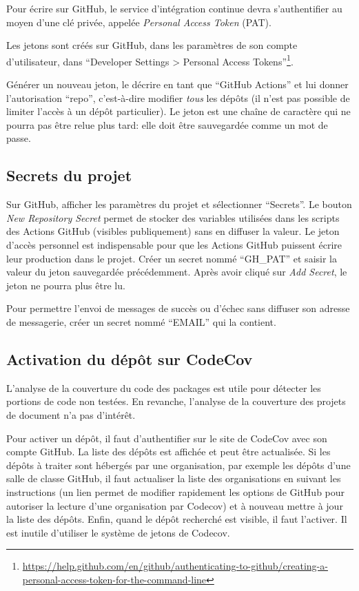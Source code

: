 \documentclass[
  12pt,
  french,
  a4paper,
  extrafontsizes,onecolumn,openright
  ]{memoir}
\begin{document}
Pour écrire sur GitHub, le service d'intégration continue devra s'authentifier au moyen d'une clé privée, appelée \emph{Personal Access Token} (PAT).

Les jetons sont créés sur GitHub, dans les paramètres de son compte d'utilisateur, dans \enquote{Developer Settings \textgreater{} Personal Access Tokens}\footnote{\url{https://help.github.com/en/github/authenticating-to-github/creating-a-personal-access-token-for-the-command-line}}.

Générer un nouveau jeton, le décrire en tant que \enquote{GitHub Actions} et lui donner l'autorisation \enquote{repo}, c'est-à-dire modifier \emph{tous} les dépôts (il n'est pas possible de limiter l'accès à un dépôt particulier).
Le jeton est une chaîne de caractère qui ne pourra pas être relue plus tard: elle doit être sauvegardée comme un mot de passe.

\hypertarget{sec:secrets-ci}{%
\subsection{Secrets du projet}\label{sec:secrets-ci}}

Sur GitHub, afficher les paramètres du projet et sélectionner \enquote{Secrets}.
Le bouton \emph{New Repository Secret} permet de stocker des variables utilisées dans les scripts des Actions GitHub (visibles publiquement) sans en diffuser la valeur.
Le jeton d'accès personnel est indispensable pour que les Actions GitHub puissent écrire leur production dans le projet.
Créer un secret nommé \enquote{GH\_PAT} et saisir la valeur du jeton sauvegardée précédemment.
Après avoir cliqué sur \emph{Add Secret}, le jeton ne pourra plus être lu.

Pour permettre l'envoi de messages de succès ou d'échec sans diffuser son adresse de messagerie, créer un secret nommé \enquote{EMAIL} qui la contient.

\hypertarget{activation-du-duxe9puxf4t-sur-codecov}{%
\subsection{Activation du dépôt sur CodeCov}\label{activation-du-duxe9puxf4t-sur-codecov}}

L'analyse de la couverture du code des packages est utile pour détecter les portions de code non testées.
En revanche, l'analyse de la couverture des projets de document n'a pas d'intérêt.

Pour activer un dépôt, il faut d'authentifier sur le site de CodeCov avec son compte GitHub.
La liste des dépôts est affichée et peut être actualisée.
Si les dépôts à traiter sont hébergés par une organisation, par exemple les dépôts d'une salle de classe GitHub, il faut actualiser la liste des organisations en suivant les instructions (un lien permet de modifier rapidement les options de GitHub pour autoriser la lecture d'une organisation par Codecov) et à nouveau mettre à jour la liste des dépôts.
Enfin, quand le dépôt recherché est visible, il faut l'activer.
Il est inutile d'utiliser le système de jetons de Codecov.
\end{document}
